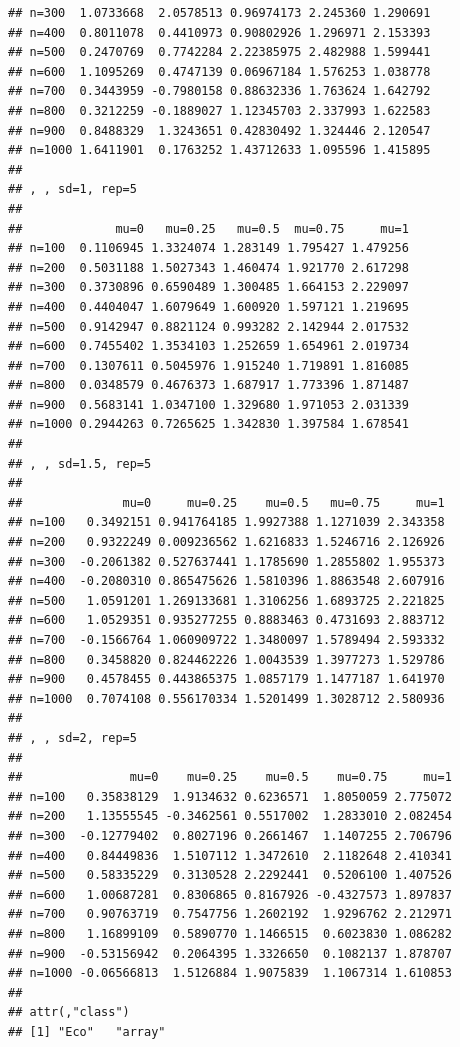 \documentclass[11pt,a4paper]{article}
\begin{document}
\begin{verbatim}
## n=300  1.0733668  2.0578513 0.96974173 2.245360 1.290691
## n=400  0.8011078  0.4410973 0.90802926 1.296971 2.153393
## n=500  0.2470769  0.7742284 2.22385975 2.482988 1.599441
## n=600  1.1095269  0.4747139 0.06967184 1.576253 1.038778
## n=700  0.3443959 -0.7980158 0.88632336 1.763624 1.642792
## n=800  0.3212259 -0.1889027 1.12345703 2.337993 1.622583
## n=900  0.8488329  1.3243651 0.42830492 1.324446 2.120547
## n=1000 1.6411901  0.1763252 1.43712633 1.095596 1.415895
## 
## , , sd=1, rep=5
## 
##             mu=0   mu=0.25   mu=0.5  mu=0.75     mu=1
## n=100  0.1106945 1.3324074 1.283149 1.795427 1.479256
## n=200  0.5031188 1.5027343 1.460474 1.921770 2.617298
## n=300  0.3730896 0.6590489 1.300485 1.664153 2.229097
## n=400  0.4404047 1.6079649 1.600920 1.597121 1.219695
## n=500  0.9142947 0.8821124 0.993282 2.142944 2.017532
## n=600  0.7455402 1.3534103 1.252659 1.654961 2.019734
## n=700  0.1307611 0.5045976 1.915240 1.719891 1.816085
## n=800  0.0348579 0.4676373 1.687917 1.773396 1.871487
## n=900  0.5683141 1.0347100 1.329680 1.971053 2.031339
## n=1000 0.2944263 0.7265625 1.342830 1.397584 1.678541
## 
## , , sd=1.5, rep=5
## 
##              mu=0     mu=0.25    mu=0.5   mu=0.75     mu=1
## n=100   0.3492151 0.941764185 1.9927388 1.1271039 2.343358
## n=200   0.9322249 0.009236562 1.6216833 1.5246716 2.126926
## n=300  -0.2061382 0.527637441 1.1785690 1.2855802 1.955373
## n=400  -0.2080310 0.865475626 1.5810396 1.8863548 2.607916
## n=500   1.0591201 1.269133681 1.3106256 1.6893725 2.221825
## n=600   1.0529351 0.935277255 0.8883463 0.4731693 2.883712
## n=700  -0.1566764 1.060909722 1.3480097 1.5789494 2.593332
## n=800   0.3458820 0.824462226 1.0043539 1.3977273 1.529786
## n=900   0.4578455 0.443865375 1.0857179 1.1477187 1.641970
## n=1000  0.7074108 0.556170334 1.5201499 1.3028712 2.580936
## 
## , , sd=2, rep=5
## 
##               mu=0    mu=0.25    mu=0.5    mu=0.75     mu=1
## n=100   0.35838129  1.9134632 0.6236571  1.8050059 2.775072
## n=200   1.13555545 -0.3462561 0.5517002  1.2833010 2.082454
## n=300  -0.12779402  0.8027196 0.2661467  1.1407255 2.706796
## n=400   0.84449836  1.5107112 1.3472610  2.1182648 2.410341
## n=500   0.58335229  0.3130528 2.2292441  0.5206100 1.407526
## n=600   1.00687281  0.8306865 0.8167926 -0.4327573 1.897837
## n=700   0.90763719  0.7547756 1.2602192  1.9296762 2.212971
## n=800   1.16899109  0.5890770 1.1466515  0.6023830 1.086282
## n=900  -0.53156942  0.2064395 1.3326650  0.1082137 1.878707
## n=1000 -0.06566813  1.5126884 1.9075839  1.1067314 1.610853
## 
## attr(,"class")
## [1] "Eco"   "array"

\end{verbatim}
\end{document}
